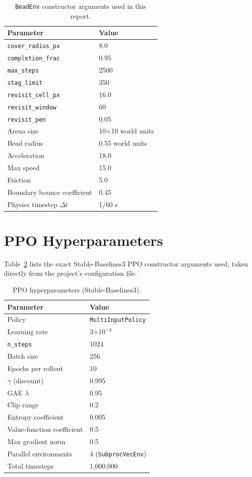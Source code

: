 \documentclass[conference]{IEEEtran}
\begin{document}
\begin{table}[h]
\centering
\caption{\texttt{BeadEnv} constructor arguments used in this report.}
\label{tab:envkwargs}
\begin{tabular}{@{}ll@{}}
\toprule
Parameter & Value \\
\midrule
\texttt{cover\_radius\_px} & 8.0 \\
\texttt{completion\_frac} & 0.95 \\
\texttt{max\_steps} & 2500 \\
\texttt{stag\_limit} & 350 \\
\texttt{revisit\_cell\_px} & 16.0 \\
\texttt{revisit\_window} & 60 \\
\texttt{revisit\_pen} & 0.05 \\
\midrule
Arena size & 10$\times$10 world units \\
Bead radius & 0.55 world units \\
Acceleration & 18.0 \\
Max speed & 15.0 \\
Friction & 5.0 \\
Boundary bounce coefficient & 0.45 \\
Physics timestep $\Delta t$ & 1/60 s \\
\bottomrule
\end{tabular}
\end{table}

\section{PPO Hyperparameters}
\label{app:ppo}

Table~\ref{tab:ppokwargs} lists the exact Stable-Baselines3 PPO constructor arguments used, taken directly from the project's configuration file.

\begin{table}[h]
\centering
\caption{PPO hyperparameters (Stable-Baselines3).}
\label{tab:ppokwargs}
\begin{tabular}{@{}ll@{}}
\toprule
Parameter & Value \\
\midrule
Policy & \texttt{MultiInputPolicy} \\
Learning rate & 3$\times10^{-4}$ \\
\texttt{n\_steps} & 1024 \\
Batch size & 256 \\
Epochs per rollout & 10 \\
$\gamma$ (discount) & 0.995 \\
GAE $\lambda$ & 0.95 \\
Clip range & 0.2 \\
Entropy coefficient & 0.005 \\
Value-function coefficient & 0.5 \\
Max gradient norm & 0.5 \\
Parallel environments & 4 (\texttt{SubprocVecEnv}) \\
Total timesteps & 1{,}000{,}000 \\
\bottomrule
\end{tabular}
\end{table}
\end{document}
